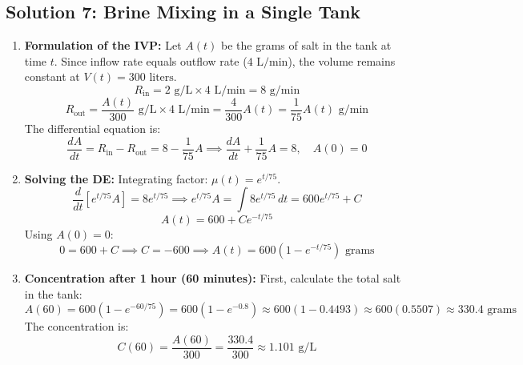 \documentclass[11pt,letterpaper]{article}
\begin{document}
\subsection*{Solution 7: Brine Mixing in a Single Tank}
\begin{enumerate}[label=(\alph*)]
    \item \textbf{Formulation of the IVP:}
    Let $A(t)$ be the grams of salt in the tank at time $t$. Since inflow rate equals outflow rate ($4\text{ L/min}$), the volume remains constant at $V(t) = 300\text{ liters}$.
    \[ R_{\text{in}} = 2\text{ g/L} \times 4\text{ L/min} = 8\text{ g/min} \]
    \[ R_{\text{out}} = \frac{A(t)}{300}\text{ g/L} \times 4\text{ L/min} = \frac{4}{300} A(t) = \frac{1}{75} A(t)\text{ g/min} \]
    The differential equation is:
    \[ \frac{dA}{dt} = R_{\text{in}} - R_{\text{out}} = 8 - \frac{1}{75}A \implies \frac{dA}{dt} + \frac{1}{75}A = 8, \quad A(0) = 0 \]

    \item \textbf{Solving the DE:}
    Integrating factor: $\mu(t) = e^{t/75}$.
    \[ \frac{d}{dt}\left[ e^{t/75} A \right] = 8 e^{t/75} \implies e^{t/75} A = \int 8 e^{t/75} \, dt = 600 e^{t/75} + C \]
    \[ A(t) = 600 + C e^{-t/75} \]
    Using $A(0) = 0$:
    \[ 0 = 600 + C \implies C = -600 \implies A(t) = 600(1 - e^{-t/75}) \text{ grams} \]

    \item \textbf{Concentration after 1 hour (60 minutes):}
    First, calculate the total salt in the tank:
    \[ A(60) = 600(1 - e^{-60/75}) = 600(1 - e^{-0.8}) \approx 600(1 - 0.4493) \approx 600(0.5507) \approx 330.4\text{ grams} \]
    The concentration is:
    \[ C(60) = \frac{A(60)}{300} = \frac{330.4}{300} \approx 1.101 \text{ g/L} \]
\end{enumerate}
\end{document}
